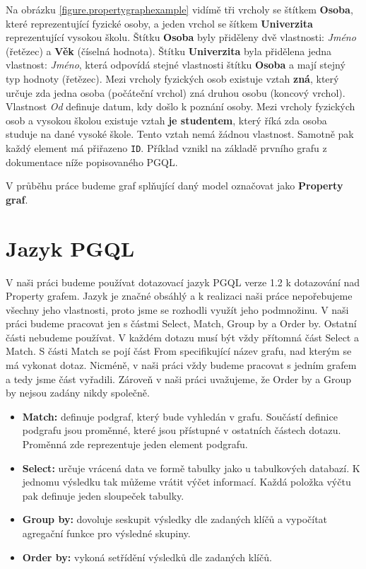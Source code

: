 Na obrázku \ref{figure.propertygraphexample} vidímě tři vrcholy se štítkem \textbf{Osoba}, které reprezentující fyzické osoby, a jeden vrchol se šítkem \textbf{Univerzita} reprezentující vysokou školu.
Štítku \textbf{Osoba} byly přiděleny dvě vlastnosti: \textit{Jméno} (řetězec) a \textbf{Věk} (číselná hodnota).
Štítku \textbf{Univerzita} byla přidělena jedna vlastnost: \textit{Jméno}, která odpovídá stejné vlastnosti štítku \textbf{Osoba} a mají stejný typ hodnoty (řetězec).
Mezi vrcholy fyzických osob existuje vztah \textbf{zná}, který určuje zda jedna osoba (počáteční vrchol) zná druhou osobu (koncový vrchol).
Vlastnost \textit{Od} definuje datum, kdy došlo k poznání osoby.
Mezi vrcholy fyzických osob a vysokou školou existuje vztah \textbf{je studentem}, který říká zda osoba studuje na dané vysoké škole.
Tento vztah nemá žádnou vlastnost.
Samotně pak každý element má přiřazeno \texttt{ID}.
Příklad vznikl na základě prvního grafu z dokumentace níže popisovaného PGQL.

V průběhu práce budeme graf splňující daný model označovat jako \textbf{Property graf}.

\section{Jazyk PGQL}
\label{req.pgql}

V naši práci budeme používat dotazovací jazyk PGQL \citep{pgql} verze 1.2 k dotazování nad Property grafem.
Jazyk je značné obsáhlý a k realizaci naši práce nepořebujeme všechny jeho vlastnosti, proto jsme se rozhodli využít jeho podmnožinu.
V naši práci budeme pracovat jen s částmi Select, Match, Group by a Order by.
Ostatní části nebudeme používat.
V každém dotazu musí být vždy přítomná část Select a Match.
S části Match se pojí část From specifikující název grafu, nad kterým se má vykonat dotaz.
Nicméně, v naši práci vždy budeme pracovat s jedním grafem a tedy jsme část vyřadili. 
Zároveň v naši práci uvažujeme, že Order by a Group by nejsou zadány nikdy společně.

\begin{itemize}
\item \textbf{Match:} definuje podgraf, který bude vyhledán v grafu.
Součástí definice podgrafu jsou proměnné, které jsou přístupné v ostatních částech dotazu.
Proměnná zde reprezentuje jeden element podgrafu.

\item \textbf{Select:} určuje vrácená data ve formě tabulky jako u tabulkových databazí.
K jednomu výsledku tak můžeme vrátit výčet informací.
Každá položka výčtu pak definuje jeden sloupeček tabulky.

\item \textbf{Group by:} dovoluje seskupit výsledky dle zadaných klíčů a vypočítat agregační funkce pro výsledné skupiny.

\item \textbf{Order by:} vykoná setřídění výsledků dle zadaných klíčů.
\end{itemize}

